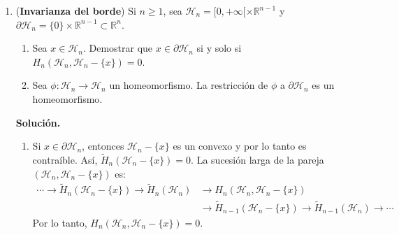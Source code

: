 \documentclass[11pt,a4paper]{article}
\theoremstyle{plain}
\theoremstyle{definition}
\theoremstyle{remark}
\newcommand{\RR}{\mathbb R}
\begin{document}
\begin{enumerate}[label=\arabic*.,leftmargin=*]
\begin{enumerate}[label=\alph*)]
Sin embargo, $U-\{x\}$ es homotópicamente equivalente a $S^{n-1}$, de modo
que
\[
\tilde H_{q-1}(U-\{x\})\cong\tilde H_{q-1}(S^{n-1})=\begin{cases}R & q=n\\0 & q\ne n.\end{cases}
\]
\item Si $x$ es un punto de $U$, entonces $\{U,\RR^n-\{x\}\}$ es una
cubierta abierta de $\RR^n$. Ya que tanto $U$ como $\RR^n-\{x\}$ es
abierto, entonces la pareja $\{U,\RR^n-\{x\}\}$ es escisiva. Por el
ejercicio 3, se tiene que la inclusión
\[
j:(U,U\cap(\RR^n-\{x\}))=(U,U-\{x\})\hookrightarrow(\RR^n,\RR^n-\{x\})
\]
induce el isomorfismo $H_\bullet(U,U-\{x\})\cong H_\bullet(\RR^n,\RR^n-\{x\})$.
De igual forma, si $y\in V$, se tiene
$H_\bullet(V,V-\{y\})\cong H_\bullet(\RR^m,\RR^m-\{y\})$.

Supongamos que existe un homeomorfismo entre $U$ y $V$, entonces
\[
H_\bullet(U,U-\{x\})\cong H_\bullet(V,V-\{y\}).
\]
Por el inciso anterior, tiene que suceder que $n=m$.
\end{enumerate}

\item (\textbf{Invarianza del borde}) Si $n\ge1$, sea
$\mathcal H_n=[0,+\infty[\times\RR^{n-1}$ y
$\partial\mathcal H_n=\{0\}\times\RR^{n-1}\subset\RR^n$.
\begin{enumerate}[label=\alph*)]
\item Sea $x\in\mathcal H_n$. Demostrar que $x\in\partial\mathcal H_n$ si y
solo si $H_n(\mathcal H_n,\mathcal H_n-\{x\})=0$.
\item Sea $\phi:\mathcal H_n\to\mathcal H_n$ un homeomorfismo. La
restricción de $\phi$ a $\partial\mathcal H_n$ es un homeomorfismo.
\end{enumerate}

\noindent\textbf{Solución.}
\begin{enumerate}[label=\alph*)]
\item Si $x\in\partial\mathcal H_n$, entonces $\mathcal H_n-\{x\}$ es un
convexo y por lo tanto es contraíble. Así,
$\tilde H_n(\mathcal H_n-\{x\})=0$. La sucesión larga de la pareja
$(\mathcal H_n,\mathcal H_n-\{x\})$ es:
\[
\begin{aligned}
\cdots\to\tilde H_n(\mathcal H_n-\{x\})\to\tilde H_n(\mathcal H_n)&\to H_n(\mathcal H_n,\mathcal H_n-\{x\})\\
&\to\tilde H_{n-1}(\mathcal H_n-\{x\})\to\tilde H_{n-1}(\mathcal H_n)\to\cdots
\end{aligned}
\]
Por lo tanto, $H_n(\mathcal H_n,\mathcal H_n-\{x\})=0$.


\end{enumerate}
\end{enumerate}
\end{document}
